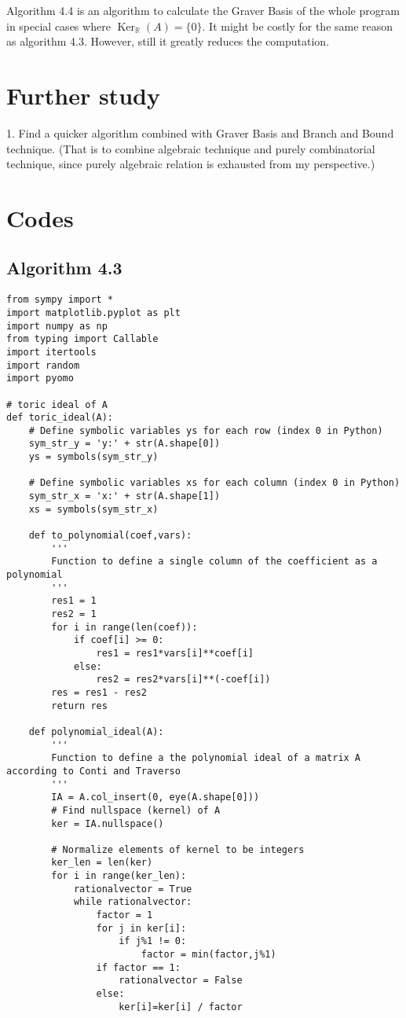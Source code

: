 \documentclass{article}
\theoremstyle{plain}
\theoremstyle{definition}
\begin{document}
\begin{propsition}
Algorithm 4.4 is an algorithm to calculate the Graver Basis of the whole program in special cases where $\operatorname{Ker}_{\mathbb{R}}(A)=\{0\}$. It might be costly for the same reason as algorithm 4.3. However, still it greatly reduces the computation.






\section{Further study}
1. Find a quicker algorithm combined with Graver Basis and Branch and Bound technique.
(That is to combine algebraic technique and purely combinatorial technique, since purely algebraic relation is exhausted from my perspective.)

\newpage
\section{Codes}
\subsection{Algorithm 4.3}
\begin{verbatim}
from sympy import *
import matplotlib.pyplot as plt
import numpy as np
from typing import Callable
import itertools
import random
import pyomo

# toric ideal of A
def toric_ideal(A):
    # Define symbolic variables ys for each row (index 0 in Python)
    sym_str_y = 'y:' + str(A.shape[0])
    ys = symbols(sym_str_y)
    
    # Define symbolic variables xs for each column (index 0 in Python)
    sym_str_x = 'x:' + str(A.shape[1])
    xs = symbols(sym_str_x)

    def to_polynomial(coef,vars):
        '''
        Function to define a single column of the coefficient as a polynomial
        '''
        res1 = 1
        res2 = 1
        for i in range(len(coef)):
            if coef[i] >= 0:
                res1 = res1*vars[i]**coef[i]
            else:
                res2 = res2*vars[i]**(-coef[i])
        res = res1 - res2
        return res

    def polynomial_ideal(A):
        '''
        Function to define a the polynomial ideal of a matrix A according to Conti and Traverso
        '''
        IA = A.col_insert(0, eye(A.shape[0]))
        # Find nullspace (kernel) of A
        ker = IA.nullspace()

        # Normalize elements of kernel to be integers
        ker_len = len(ker)
        for i in range(ker_len):
            rationalvector = True
            while rationalvector:
                factor = 1
                for j in ker[i]:
                    if j%1 != 0:
                        factor = min(factor,j%1)
                if factor == 1:
                    rationalvector = False
                else:
                    ker[i]=ker[i] / factor


\end{verbatim}
\end{propsition}
\end{document}
